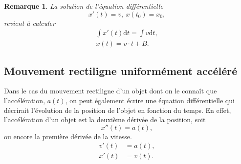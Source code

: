 \documentclass[a4paper,12pt]{book}
\newcommand{\dd}{\mathrm{d}}
\newtheorem*{remarque}{Remarque}
\begin{document}
\begin{remarque}
La solution de l'équation différentielle
\begin{equation}
 x'(t)=v,\ x(t_0)=x_0,
\end{equation}
revient à calculer 
\begin{align*}
 \int x'(t)\dd t=\int v \dd t,\\
 x(t)=v\cdot t + B.
\end{align*}
\end{remarque}

\subsection{Mouvement rectiligne uniformément accéléré}

Dans le cas du mouvement rectiligne d'un objet dont on le connaît que l'accélération, $a(t)$, on peut également écrire une équation différentielle
qui décrirait l'évolution de la position de l'objet en fonction du temps. En effet, l'accélération d'un objet est la deuxième dérivée 
de la position, soit
\begin{equation}
x''(t)=a(t),
\end{equation}
ou encore la première dérivée de la vitesse.
\begin{align}
v'(t)&=a(t),\\
x'(t)&=v(t).
\end{align}
\end{document}
